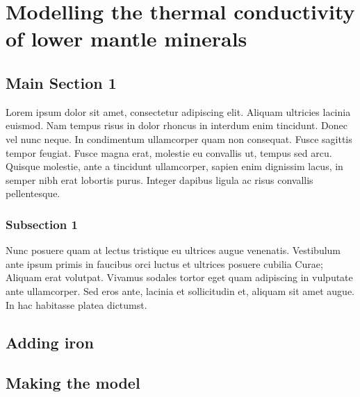 
\chapter{Modelling the thermal conductivity of lower mantle minerals} %

\label{Chapter4} %


\section{Main Section 1}

Lorem ipsum dolor sit amet, consectetur adipiscing elit. Aliquam ultricies lacinia euismod. Nam tempus risus in dolor rhoncus in interdum enim tincidunt. Donec vel nunc neque. In condimentum ullamcorper quam non consequat. Fusce sagittis tempor feugiat. Fusce magna erat, molestie eu convallis ut, tempus sed arcu. Quisque molestie, ante a tincidunt ullamcorper, sapien enim dignissim lacus, in semper nibh erat lobortis purus. Integer dapibus ligula ac risus convallis pellentesque.

\subsection{Subsection 1}

Nunc posuere quam at lectus tristique eu ultrices augue venenatis. Vestibulum ante ipsum primis in faucibus orci luctus et ultrices posuere cubilia Curae; Aliquam erat volutpat. Vivamus sodales tortor eget quam adipiscing in vulputate ante ullamcorper. Sed eros ante, lacinia et sollicitudin et, aliquam sit amet augue. In hac habitasse platea dictumst.

\section{Adding iron}





\section{Making the model}

